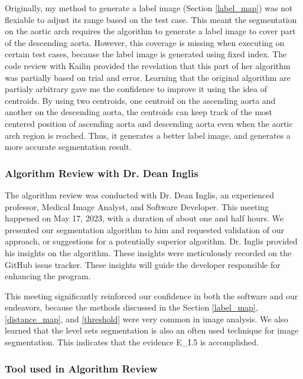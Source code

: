 Originally, my method to generate a label image (Section \ref{label_map}) was not flexiable to adjust its range based on the test case. This meant the segmentation on the aortic arch requires the algorithm to generate a label image to cover part of the descending aorta. However, this coverage is missing when executing on certain test cases, because the label image is generated using fixed index. The code review with Kailin provided the revelation that this part of her algorithm was partially based on trial and error. Learning that the original algorithm are partialy arbitrary gave me the confidence to improve it using the idea of centroids. By using two centroids, one centroid on the ascending aorta and another on the descending aorta, the centroids can keep track of the most centered position of ascending aorta and descending aorta even when the aortic arch region is reached. Thus, it generates a better label image, and generates a more accurate segmentation result.

\subsubsection{Algorithm Review with Dr. Dean Inglis}

The algorithm review was conducted with Dr. Dean Inglis, an experienced professor, Medical Image Analyst, and Software Developer. This meeting happened on May 17, 2023, with a duration of about one and half hours. We presented our segmentation algorithm to him and requested validation of our approach, or suggestions for a potentially superior algorithm. Dr. Inglis provided his insights on the algorithm. These insights were meticulously recorded on the GitHub issue tracker. These insights will guide the developer responsible for enhancing the program.

This meeting significantly reinforced our confidence in both the software and our endeavors, because the methods discussed in the Section \ref{label_map}, \ref{distance_map}, and \ref{threshold} were very common in image analysis. We also learned that the level sets segmentation is also an often used technique for image segmentation. This indicates that the evidence E\_I.5 is accomplished.

\subsubsection{Tool used in Algorithm Review}

